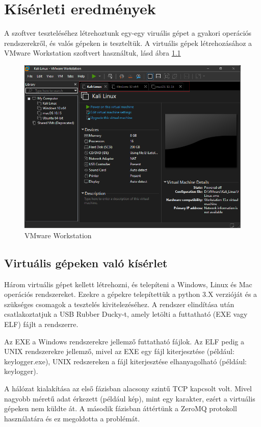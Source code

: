 \documentclass[12pt,a4paper,oneside]{report}
\begin{document}
\chapter{Kísérleti eredmények}\label{sec:testcases}
A szoftver teszteléséhez létrehoztunk egy-egy viruális gépet a gyakori operációs rendszerekről, és valós gépeken is teszteltük. A virtuális gépek létrehozásához a VMware Workstation szoftvert használtuk, lásd ábra \ref{fig:VMware1}
\begin{figure}[H]
\centering
\includegraphics[width=400pt]{../images/VMware1}
\caption{VMware Workstation}
\label{fig:VMware1}
\end{figure}

\section{Virtuális gépeken való kísérlet}
Három virtuális gépet kellett létrehozni, és telepíteni a Windows, Linux és Mac operációs rendszereket. Ezekre a gépekre telepítettük a python 3.X verzióját és a szükséges csomagok a tesztelés kivitelezéséhez. A rendszer elindítása után csatlakoztatjuk a USB Rubber Ducky-t, amely letölti a futtatható (EXE vagy ELF) fájlt a rendszerre.

Az EXE a Windows rendszerekre jellemző futtatható fájlok. Az ELF pedig a UNIX rendszerekre jellemző, mivel az EXE egy fájl kiterjesztése (például: keylogger.exe), UNIX redszereken a fájl kiterjesztése elhanyagolható (például: keylogger).

A hálózat kialakítása az első fázisban alacsony szintű TCP kapcsolt volt. Mivel nagyobb méretű adat érkezett (például kép), mint egy karakter, ezért a virtuális gépeken nem küldte át. A második fázisban áttértünk a ZeroMQ protokoll használatára és ez megoldotta a problémát.
\end{document}
